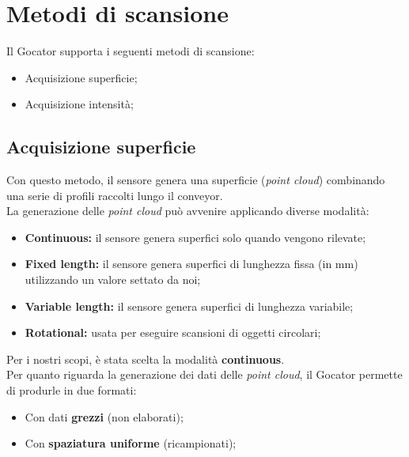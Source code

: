 \newpage

\section{Metodi di scansione}
Il Gocator supporta i seguenti metodi di scansione:

\begin{itemize}
	\item Acquisizione superficie;
	\item Acquisizione intensità;
\end{itemize}

\subsection{Acquisizione superficie}
Con questo metodo, il sensore genera una superficie (\textit{point cloud}) combinando una serie di profili raccolti lungo il conveyor.\\
\newline
La generazione delle \textit{point cloud} può avvenire applicando diverse modalità:

\begin{itemize}
	\item \textbf{Continuous:} il sensore genera superfici solo quando vengono rilevate;
	\item \textbf{Fixed length:} il sensore genera superfici di lunghezza fissa (in mm) utilizzando un valore settato da noi;
	\item \textbf{Variable length:} il sensore genera superfici di lunghezza variabile;
	\item \textbf{Rotational:} usata per eseguire scansioni di oggetti circolari;
\end{itemize}

\noindent Per i nostri scopi, è stata scelta la modalità \textbf{continuous}.\\
\newline
Per quanto riguarda la generazione dei dati delle \textit{point cloud}, il Gocator permette di produrle in due formati:

\begin{itemize}
	\item Con dati \textbf{grezzi} (non elaborati);
	\item Con \textbf{spaziatura uniforme} (ricampionati);
\end{itemize}

